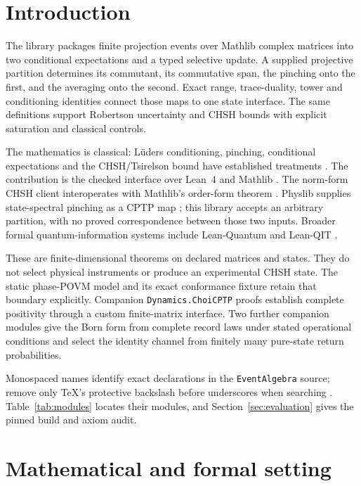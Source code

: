 \documentclass[11pt]{article}
\renewcommand{\_}{\textunderscore\allowbreak}
\theoremstyle{remark}
\begin{document}
\section{Introduction}
\label{sec:intro}

The library packages finite projection events over Mathlib complex matrices
into two conditional expectations and a typed selective update. A supplied
projective partition determines its commutant, its commutative span, the
pinching onto the first, and the averaging onto the second. Exact range,
trace-duality, tower and conditioning identities connect those maps to one
state interface. The same definitions support Robertson uncertainty and
CHSH bounds with explicit saturation and classical controls.

The mathematics is classical: L\"uders conditioning, pinching, conditional
expectations and the CHSH/Tsirelson bound have established treatments
\cite{lueders1950,bhatia2000,umegaki1954,takesaki1972,chsh1969,tsirelson1980}.
The contribution is the checked interface over Lean~4 and Mathlib
\cite{lean4,mathlib2020}. The norm-form CHSH client interoperates with
Mathlib's order-form theorem \cite{mathlibCHSH2026}. Physlib supplies
state-spectral pinching as a CPTP map \cite{physlibPinching2026}; this
library accepts an arbitrary partition, with no proved correspondence
between those two inputs. Broader formal quantum-information systems
include Lean-Quantum and Lean-QIT
\cite{kasauraEtAl2026LeanQuantum,zhuEtAl2026LeanQIT}.

These are finite-dimensional theorems on declared matrices and states.
They do not select physical instruments or produce an experimental CHSH
state. The static phase-POVM model and its exact conformance fixture retain
that boundary explicitly. Companion \texttt{Dynamics.ChoiCPTP} proofs
establish complete positivity through a custom finite-matrix interface. Two
further companion modules give the Born form from complete record laws under
stated operational conditions and select the identity channel from finitely
many pure-state return probabilities.

Monospaced names identify exact declarations in the \texttt{EventAlgebra}
source; remove only TeX's protective backslash before underscores when
searching \cite{observerPatchHolographyRepo}. Table~\ref{tab:modules}
locates their modules, and Section~\ref{sec:evaluation} gives the pinned
build and axiom audit.

\section{Mathematical and formal setting}
\label{sec:setting}
\end{document}
